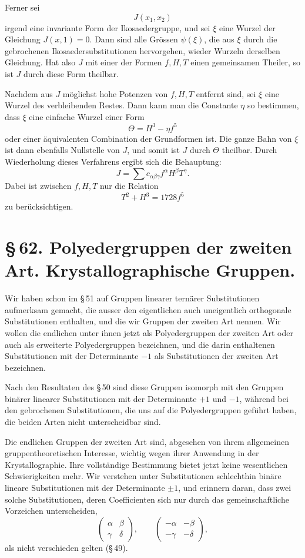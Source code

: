 \documentclass[11pt]{article}
\begin{document}
Ferner sei
\[
 J(x_1,x_2)
\]
irgend eine invariante Form der Ikosaedergruppe, und sei $\xi$ eine Wurzel der Gleichung $J(x,1)=0$. Dann sind alle Grössen $\psi(\xi)$, die aus $\xi$ durch die gebrochenen Ikosaedersubstitutionen hervorgehen, wieder Wurzeln derselben Gleichung. Hat also $J$ mit einer der Formen $f,H,T$ einen gemeinsamen Theiler, so ist $J$ durch diese Form theilbar.

Nachdem aus $J$ möglichst hohe Potenzen von $f,H,T$ entfernt sind, sei $\xi$ eine Wurzel des verbleibenden Restes. Dann kann man die Constante $\eta$ so bestimmen, dass $\xi$ eine einfache Wurzel einer Form
\[
 \Theta=H^3-\eta f^5
\]
oder einer äquivalenten Combination der Grundformen ist. Die ganze Bahn von $\xi$ ist dann ebenfalls Nullstelle von $J$, und somit ist $J$ durch $\Theta$ theilbar. Durch Wiederholung dieses Verfahrens ergibt sich die Behauptung:
\[
 J=\sum c_{\alpha\beta\gamma} f^\alpha H^\beta T^\gamma .
\]
Dabei ist zwischen $f,H,T$ nur die Relation
\[
 T^2+H^3=1728f^5
\]
zu berücksichtigen.



\section*{\S\,62. Polyedergruppen der zweiten Art. Krystallographische Gruppen.}

Wir haben schon im \S\,51 auf Gruppen linearer ternärer Substitutionen aufmerksam gemacht, die ausser den eigentlichen auch uneigentlich orthogonale Substitutionen enthalten, und die wir Gruppen der zweiten Art nennen. Wir wollen die endlichen unter ihnen jetzt als Polyedergruppen der zweiten Art oder auch als erweiterte Polyedergruppen bezeichnen, und die darin enthaltenen Substitutionen mit der Determinante $-1$ als Substitutionen der zweiten Art bezeichnen.

Nach den Resultaten des \S\,50 sind diese Gruppen isomorph mit den Gruppen binärer linearer Substitutionen mit der Determinante $+1$ und $-1$, während bei den gebrochenen Substitutionen, die uns auf die Polyedergruppen geführt haben, die beiden Arten nicht unterscheidbar sind.

Die endlichen Gruppen der zweiten Art sind, abgesehen von ihrem allgemeinen gruppentheoretischen Interesse, wichtig wegen ihrer Anwendung in der Krystallographie. Ihre vollständige Bestimmung bietet jetzt keine wesentlichen Schwierigkeiten mehr. Wir verstehen unter Substitutionen schlechthin binäre lineare Substitutionen mit der Determinante $\pm1$, und erinnern daran, dass zwei solche Substitutionen, deren Coefficienten sich nur durch das gemeinschaftliche Vorzeichen unterscheiden,
\[
 \begin{pmatrix}\alpha&\beta\\ \gamma&\delta\end{pmatrix},\qquad
 \begin{pmatrix}-\alpha&-\beta\\ -\gamma&-\delta\end{pmatrix},
\]
als nicht verschieden gelten (\S\,49).
\end{document}
